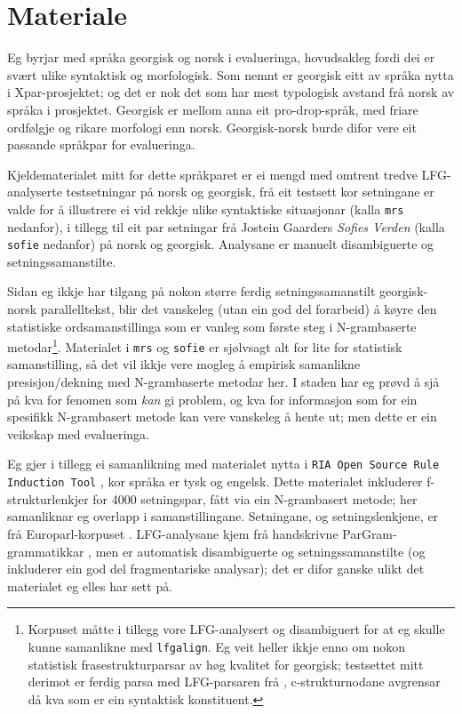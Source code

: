 \documentclass[12pt,a4paper,oneside,draft]{report}
\begin{document}
  
\section{Materiale}
\label{sec-5.1}

Eg byrjar med språka georgisk og norsk i evalueringa, hovudsakleg
 fordi dei er svært ulike syntaktisk og morfologisk. Som nemnt er
 georgisk eitt av språka nytta i Xpar-prosjektet; og det er nok det
 som har mest typologisk avstand frå norsk av språka i prosjektet.
 Georgisk er mellom anna eit pro-drop-språk, med friare ordfølgje og
 rikare morfologi enn norsk. Georgisk-norsk burde difor vere eit
 passande språkpar for evalueringa.

Kjeldematerialet mitt for dette språkparet er ei mengd med
 omtrent tredve LFG-analyserte testsetningar på norsk og georgisk, frå
 eit testsett kor setningane er valde for å illustrere ei vid rekkje
 ulike syntaktiske situasjonar (kalla \texttt{mrs} nedanfor), i tillegg til
 eit par setningar frå Jostein Gaarders \emph{Sofies Verden} (kalla \texttt{sofie}
 nedanfor) på norsk og georgisk. Analysane er manuelt disambiguerte og
 setningssamanstilte.

Sidan eg ikkje har tilgang på nokon større ferdig setningssamanstilt
 georgisk-norsk parallelltekst, blir det vanskeleg (utan ein god del
 forarbeid) å køyre den statistiske ordsamanstillinga som er vanleg
 som første steg i N-grambaserte metodar\footnote{Korpuset måtte i tillegg vore LFG-analysert og disambiguert
        for at eg skulle kunne samanlikne med \texttt{lfgalign}. Eg veit
        heller ikkje enno om nokon statistisk frasestrukturparsar av
        høg kvalitet for georgisk; testsettet mitt derimot er ferdig
        parsa med LFG-parsaren frå \citet{meurer2008cgg},
        c\hyp{}strukturnodane avgrensar då kva som er ein syntaktisk
        konstituent. }. Materialet i \texttt{mrs}
 og \texttt{sofie} er sjølvsagt alt for lite for statistisk samanstilling, så
 det vil ikkje vere mogleg å empirisk samanlikne presisjon/dekning med
 N-grambaserte metodar her. I staden har eg prøvd å sjå på kva for
 fenomen som \emph{kan} gi problem, og kva for informasjon som for ein
 spesifikk N-grambasert metode kan vere vanskeleg å hente ut; men
 dette er ein veikskap med evalueringa.

Eg gjer i tillegg ei samanlikning med materialet nytta i \texttt{RIA Open  Source Rule Induction Tool} \citep{graham2009osr,graham2009fts}, kor
 språka er tysk og engelsk. Dette materialet inkluderer
 f\hyp{}strukturlenkjer for 4000 setningspar, fått via ein N-grambasert
 metode; her samanliknar eg overlapp i samanstillingane.  Setningane,
 og setningslenkjene, er frå Europarl-korpuset
 \citep{koehn2005epc}. LFG-analysane kjem frå handskrivne
 ParGram-grammatikkar \citep[m.a.~][]{kaplan2002aeg}, men er automatisk
 disambiguerte og setningssamanstilte (og inkluderer ein god del
 fragmentariske analysar); det er difor ganske ulikt det materialet eg
 elles har sett på.
\end{document}
